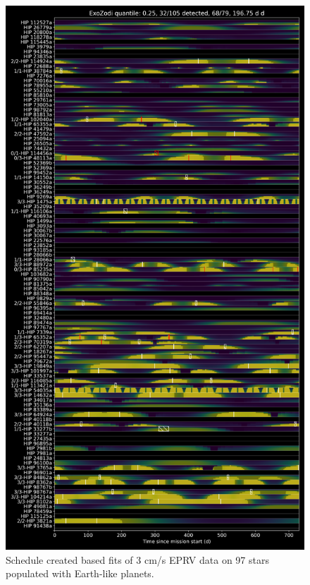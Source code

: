 \begin{figure}
  \begin{center}
    \includegraphics[height=0.9\textheight]{ch4/figures/schedule.png}
  \end{center}
  \caption{
    Schedule created based fits of 3 cm/s EPRV data on 97 stars populated with
    Earth-like planets.
  }
  \label{fig:schedule}
\end{figure}

